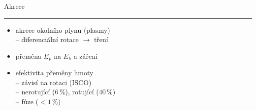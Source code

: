 \documentclass[aspectratio=43]{beamer}
\begin{document}
\begin{frame}{\vspace{-2mm}Akrece\phantom{j$^1$}\\\vspace{1.5mm}\hrule}
\begin{itemize}
    \item<1-> akrece okolního plynu (plasmy)\\ \vspace{2.7mm}
        -- diferenciální rotace $\rightarrow$ tření\\ \vspace{4.0mm}
    \item<1-> přeměna $E_p$ na $E_k$ a záření\\ \vspace{4.0mm}
    \item<2-> efektivita přeměny hmoty\\ \vspace{2.7mm}
        -- závisí na rotaci (ISCO)\\ \vspace{2.7mm}
        -- nerotující ($6\,\%$), rotující ($40\,\%$)\\ \vspace{2.7mm}
        -- fůze ($< 1\,\%$)\\
\end{itemize}
\end{frame}
\end{document}
